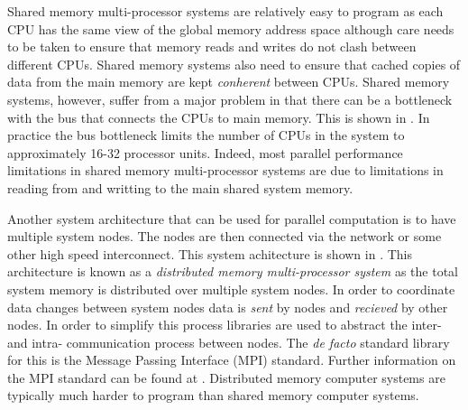 
Shared memory multi-processor systems are relatively easy to program
as each CPU has the same view of the global memory address space
although care needs to be taken to ensure that memory reads and writes
do not clash between different CPUs. Shared memory systems also need
to ensure that cached copies of data from the main memory are
kept \emph{conherent} between CPUs. Shared memory systems, however,
suffer from a major problem in that there can be a bottleneck with the
bus that connects the CPUs to main memory. This is shown
in . In practice the bus
bottleneck limits the number of CPUs in the system to approximately
16-32 processor units. Indeed, most parallel performance limitations
in shared memory multi-processor systems are due to limitations in
reading from and writting to the main shared system memory.


Another system architecture that can be used for parallel computation
is to have multiple system nodes. The nodes are then connected via the
network or some other high speed interconnect. This system achitecture
is shown in . This architecture
is known as a \emph{distributed memory multi-processor system} as the
total system memory is distributed over multiple system nodes. In
order to coordinate data changes between system nodes data
is \emph{sent} by nodes and \emph{recieved} by other nodes. In order
to simplify this process libraries are used to abstract the inter- and
intra- communication process between nodes. The \emph{de facto}
standard library for this is the Message Passing Interface (MPI)
standard. Further information on the MPI standard can be found
at . Distributed memory computer
systems are typically much harder to program than shared memory
computer systems.

